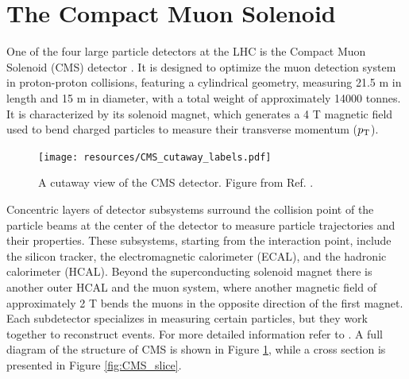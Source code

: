 \section{The Compact Muon Solenoid}\label{sec:CMS}

One of the four large particle detectors at the LHC is the Compact Muon Solenoid (CMS) detector \cite{CMS:1994hea, CMS:2008xjf}. It is designed to optimize the muon detection system in proton-proton collisions, featuring a cylindrical geometry, measuring 21.5 m in length and 15 m in diameter, with a total weight of approximately 14000 tonnes. It is characterized by its solenoid magnet, which generates a 4 T magnetic field used to bend charged particles to measure their transverse momentum ($p_\text{T}$).

\begin{figure}[!ht]
    \vspace*{-0.0cm}
    \centering
    \setlength{\mylength}{\textwidth}
    \texttt{[image: resources/CMS\_cutaway\_labels.pdf]}
    \vspace*{-0.0cm}
    \caption{A cutaway view of the CMS detector. Figure from Ref. \cite{Sakuma:2013jqa}.}
    \label{fig:CMS_cutaway}
    \vspace*{-0.3cm}
\end{figure}

Concentric layers of detector subsystems surround the collision point of the particle beams at the center of the detector to measure particle trajectories and their properties. These subsystems, starting from the interaction point, include the silicon tracker, the electromagnetic calorimeter (ECAL), and the hadronic calorimeter (HCAL). Beyond the superconducting solenoid magnet there is another outer HCAL and the muon system, where another magnetic field of approximately 2 T bends the muons in the opposite direction of the first magnet. Each subdetector specializes in measuring certain particles, but they work together to reconstruct events. For more detailed information refer to \cite{CMS:2006myw}. A full diagram of the structure of CMS is shown in Figure \ref{fig:CMS_cutaway}, while a cross section is presented in Figure \ref{fig:CMS_slice}.

